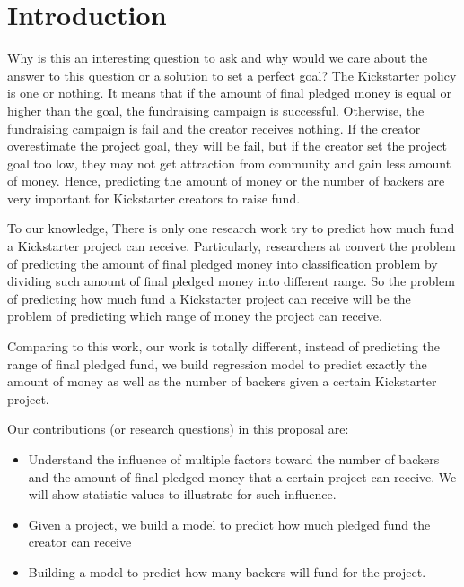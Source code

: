\section{Introduction}
Why is this an interesting question to ask and why would we care about the answer to this question or a solution to set a perfect goal? The Kickstarter policy is one or nothing. It means that if the amount of final pledged money is equal or higher than the goal, the fundraising campaign is successful. Otherwise, the fundraising campaign is fail and the creator receives nothing. If the creator overestimate the project goal, they will be fail, but if the creator set the project goal too low, they may not get attraction from community and gain less amount of money. Hence, predicting the amount of money or the number of backers are very important for Kickstarter creators to raise fund.

To our knowledge, There is only one research work try to predict how much fund a Kickstarter project can receive. Particularly, researchers at \cite{chung2015long} convert the problem of predicting the amount of final pledged money into classification problem by dividing such amount of final pledged money into different range. So the problem of predicting how much fund a Kickstarter project can receive will be the problem of predicting which range of money the project can receive.

Comparing to this work, our work is totally different, instead of predicting the range of final pledged fund, we build regression model to predict exactly the amount of money as well as the number of backers given a certain Kickstarter project.

Our contributions (or research questions) in this proposal are:
\begin{itemize}
\item Understand the influence of multiple factors toward the number of backers and the amount of final pledged money that a certain project can receive. We will show statistic values to illustrate for such influence.
\item Given a project, we build a model to predict how much pledged fund the creator can receive
\item Building a model to predict how many backers will fund for the project.
\end{itemize}